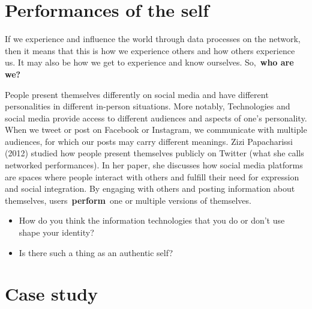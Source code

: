 \documentclass[
  letterpaper,
  DIV=11,
  numbers=noendperiod]{scrreprt}
\begin{document}
\section{Performances of the self}\label{performances-of-the-self}

If we experience and influence the world through data processes on the
network, then it means that this is how we experience others and how
others experience us. It may also be how we get to experience and know
ourselves. So,~\textbf{who are we?}

People present themselves differently on social media and have different
personalities in different in-person situations. More notably,
Technologies and social media provide access to different audiences and
aspects of one's personality. When we tweet or post on Facebook or
Instagram, we communicate with multiple audiences, for which our posts
may carry different meanings. Zizi Papacharissi (2012) studied how
people present themselves publicly on Twitter (what she calls networked
performances). In her paper, she discusses how social media platforms
are spaces where people interact with others and fulfill their need for
expression and social integration. By engaging with others and posting
information about themselves, users~\textbf{perform}~one or multiple
versions of themselves.

\begin{tcolorbox}[enhanced jigsaw, arc=.35mm, bottomrule=.15mm, bottomtitle=1mm, breakable, colback=white, colbacktitle=quarto-callout-tip-color!10!white, colframe=quarto-callout-tip-color-frame, coltitle=black, left=2mm, leftrule=.75mm, opacityback=0, opacitybacktitle=0.6, rightrule=.15mm, title=\textcolor{quarto-callout-tip-color}{\faLightbulb}\hspace{0.5em}{Pause and reflect}, titlerule=0mm, toprule=.15mm, toptitle=1mm]

\begin{itemize}
\item
  How do you think the information technologies that you do or don't use
  shape your identity?
\item
  Is there such a thing as an authentic self?
\end{itemize}

\end{tcolorbox}

\section{Case study}\label{case-study-1}
\end{document}
